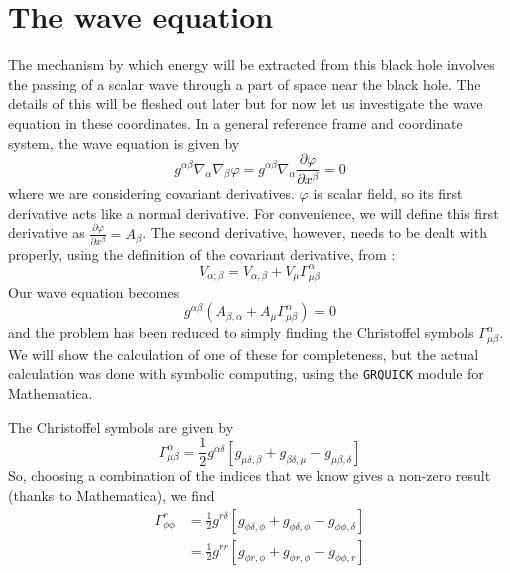 \documentclass[11pt]{article}
\numberwithin{equation}{section}
\numberwithin{figure}{section}
\numberwithin{table}{section}
\begin{document}
\section{The wave equation}\label{sec:Wave Equation}
\par The mechanism by which energy will be extracted from this black hole involves the passing of a scalar wave through a part of space near the black hole. The details of this will be fleshed out later but for now let us investigate the wave equation in these coordinates. In a general reference frame and coordinate system, the wave equation is given by
\begin{equation}
    g^{\alpha\beta}\nabla_\alpha\nabla_\beta \varphi=g^{\alpha\beta}\nabla_\alpha\frac{\partial \varphi}{\partial x^\beta}=0
    \label{eqn:general wave equation}
\end{equation}
where we are considering covariant derivatives. $\varphi$ is scalar field, so its first derivative acts like a normal derivative. For convenience, we will define this first derivative as $\frac{\partial \varphi}{\partial x^\beta} = A_\beta$. The second derivative, however, needs to be dealt with properly, using the definition of the covariant derivative, from \cite{dunsby}:
\begin{equation}
    V_{\alpha;\beta}=V_{\alpha,\beta}+V_\mu\Gamma^\alpha_{\mu\beta}
    \label{eqn:covariant derivative}
\end{equation}
Our wave equation becomes
\begin{equation*}
    g^{\alpha\beta}\left(A_{\beta,\alpha}+A_\mu\Gamma^\alpha_{\mu\beta}\right)=0
\end{equation*}
and the problem has been reduced to simply finding the Christoffel symbols $\Gamma^\alpha_{\mu\beta}$. We will show the calculation of one of these for completeness, but the actual calculation was done with symbolic computing, using the \texttt{GRQUICK} module for Mathematica.
\par The Christoffel symbols are given by 
\begin{equation}
    \Gamma^\alpha_{\mu\beta}=\frac{1}{2}g^{\alpha\delta}[g_{\mu\delta,\beta}+g_{\beta\delta,\mu}-g_{\mu\beta,\delta}]
    \label{eqn:Christoffel symbol}
\end{equation}
So, choosing a combination of the indices that we know gives a non-zero result (thanks to Mathematica), we find
\begin{align*}
    \Gamma^r_{\phi\phi}&=\frac{1}{2}g^{r\delta}[g_{\phi\delta,\phi}+g_{\phi\delta,\phi}-g_{\phi\phi,\delta}]\\
    &=\frac{1}{2}g^{rr}[g_{\phi r,\phi}+g_{\phi r,\phi}-g_{\phi\phi,r}]
\end{align*}
\end{document}
